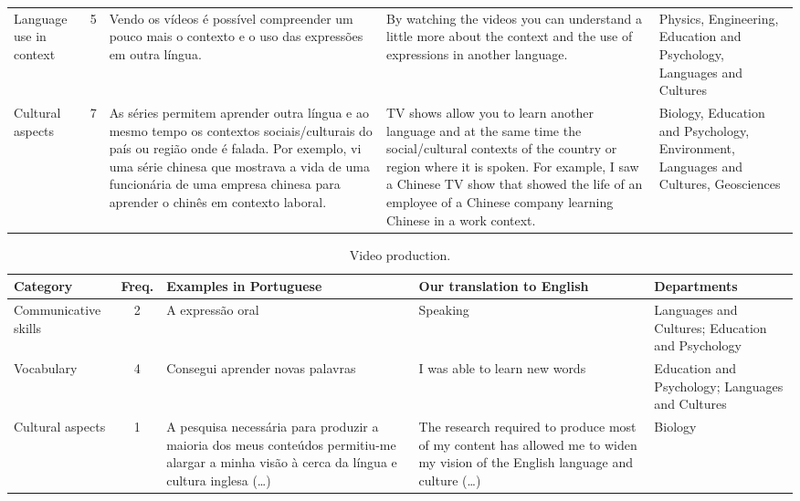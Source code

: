 \begin{table}[htpb]
\begin{threeparttable}
\begin{tabular}{p{1.5cm} c p{3cm} p{3cm} p{3cm}}
Language use in context & 5 & Vendo os vídeos é possível compreender um pouco mais o contexto e o uso das expressões em outra língua. & By watching the videos you can understand a little more about the context and the use of expressions in another language. & Physics, Engineering, Education and Psychology, Languages and Cultures \\
Cultural aspects & 7 & As séries permitem aprender outra língua e ao mesmo tempo os contextos sociais/culturais do país ou região onde é falada. Por exemplo, vi uma série chinesa que mostrava a vida de uma funcionária de uma empresa chinesa para aprender o chinês em contexto laboral. & TV shows allow you to learn another language and at the same time the social/cultural contexts of the country or region where it is spoken. For example, I saw a Chinese TV show that showed the life of an employee of a Chinese company learning Chinese in a work context. & Biology, Education and Psychology, Environment, Languages and Cultures, Geosciences \\
\bottomrule
\end{tabular}
\end{threeparttable}
\end{table}




\begin{table}[htpb]
\centering
\footnotesize
\begin{threeparttable}
\begin{tabular}{p{1.5cm} c p{3cm} p{3cm} p{3cm}}
\caption{Video production.}
\label{tab-08}\\
\toprule
Category & Freq. & Examples in Portuguese & Our translation to English & Departments \\
\midrule
Communicative skills & 2 & A expressão oral & Speaking & Languages and Cultures; Education and Psychology \\
Vocabulary & 4 & Consegui aprender novas palavras & I was able to learn new words & Education and Psychology; Languages and Cultures \\
Cultural aspects & 1 & A pesquisa necessária para produzir a maioria dos meus conteúdos permitiu-me alargar a minha visão à cerca da língua e cultura inglesa (\ldots) & The research required to produce most of my content has allowed me to widen my vision of the English language and culture (\ldots) & Biology \\
\bottomrule
\end{tabular}
\end{threeparttable}
\end{table}




